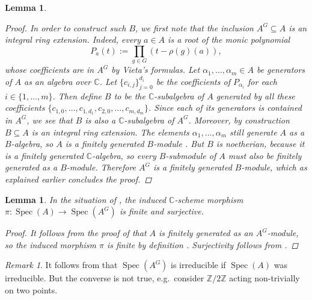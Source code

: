 \documentclass[12pt,a4paper]{amsart}
\theoremstyle{plain}
\newtheorem{lm}[thm]{Lemma}
\theoremstyle{definition}
\theoremstyle{remark}
\newtheorem{rem}[thm]{Remark}
\begin{document}
\begin{lm}
\begin{proof}
    In order to construct such $B$, we first note that the inclusion $A^{G} \subseteq A$ is an integral ring extension.
    Indeed, every $a \in A$ is a root of the monic polynomial
    \[ P_{a}(t) := \prod_{g \in G}(t - \rho(g)(a)), \]
    whose coefficients are in $A^{G}$ by Vieta's formulas.
    Let $\alpha_{1}, \ldots, \alpha_{m} \in A$ be generators of $A$ as an algebra over $\mathbb{C}$.
    Let $\{ c_{i,j} \}_{j = 0}^{d_{i}}$ be the coefficients of $P_{\alpha_{i}}$ for each $i \in \{1, \ldots, m\}$.
    Then define $B$ to be the $\mathbb{C}$-subalgebra of $A$ generated by all these coefficients $\{ c_{1,0}, \ldots, c_{1,d_{1}}, c_{2,0}, \ldots, c_{m,d_{m}} \}$.
    Since each of its generators is contained in $A^{G}$, we see that $B$ is also a $\mathbb{C}$-subalgebra of $A^{G}$.
    Moreover, by construction $B \subseteq A$ is an integral ring extension.
    The elements $\alpha_{1}, \ldots, \alpha_{m}$ still generate $A$ as a $B$-algebra, so $A$ is a finitely generated $B$-module \cite[Corollary 5.2]{am69}.
    But $B$ is noetherian, because it is a finitely generated $\mathbb{C}$-algebra, so every $B$-submodule of $A$ must also be finitely generated as a $B$-module.
    Therefore $A^{G}$ is a finitely generated $B$-module, which as explained earlier concludes the proof.
  \end{proof}

\end{lm}

\begin{lm}\label{lm:finitesurjective}
  In the situation of , the induced $\mathbb{C}$-scheme morphism $\pi \colon \operatorname{Spec}(A) \to \operatorname{Spec}(A^{G})$ is finite and surjective.

  \begin{proof}
    It follows from the proof of  that $A$ is finitely generated as an $A^{G}$-module, so the induced morphism $\pi$ is finite by definition \cite[p.~84]{har77}.
    Surjectivity follows from \cite[\href{https://stacks.math.columbia.edu/tag/00GQ}{Tag 00GQ}]{stacks-project}.
  \end{proof}
\end{lm}

\begin{rem}\label{rem:irreducible}
  It follows from  that $\operatorname{Spec}(A^{G})$ is irreducible if $\operatorname{Spec}(A)$ was irreducible.
  But the converse is not true, e.g.~consider $\mathbb{Z}/2\mathbb{Z}$ acting non-trivially on two points.
\end{rem}
\end{document}
